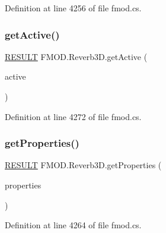 Definition at line 4256 of file fmod.\+cs.

\mbox{\label{class_f_m_o_d_1_1_reverb3_d_a3a0591025bc4ba9c5be4eee2e1cdbd62}} 
\subsubsection{\texorpdfstring{get\+Active()}{getActive()}}
{\footnotesize\ttfamily \hyperlink{namespace_f_m_o_d_a305d1176ef3f8c8815861a60407ac33d}{R\+E\+S\+U\+LT} F\+M\+O\+D.\+Reverb3\+D.\+get\+Active (\begin{DoxyParamCaption}\item[{out bool}]{active }\end{DoxyParamCaption})}



Definition at line 4272 of file fmod.\+cs.

\mbox{\label{class_f_m_o_d_1_1_reverb3_d_a9ed77465cb5c92a1f06ad874eccf85db}} 
\subsubsection{\texorpdfstring{get\+Properties()}{getProperties()}}
{\footnotesize\ttfamily \hyperlink{namespace_f_m_o_d_a305d1176ef3f8c8815861a60407ac33d}{R\+E\+S\+U\+LT} F\+M\+O\+D.\+Reverb3\+D.\+get\+Properties (\begin{DoxyParamCaption}\item[{ref \hyperlink{struct_f_m_o_d_1_1_r_e_v_e_r_b___p_r_o_p_e_r_t_i_e_s}{R\+E\+V\+E\+R\+B\+\_\+\+P\+R\+O\+P\+E\+R\+T\+I\+ES}}]{properties }\end{DoxyParamCaption})}



Definition at line 4264 of file fmod.\+cs.

\mbox{\label{class_f_m_o_d_1_1_reverb3_d_a0193d3e1ffd3f9a38afaf122a7b7b095}} 
